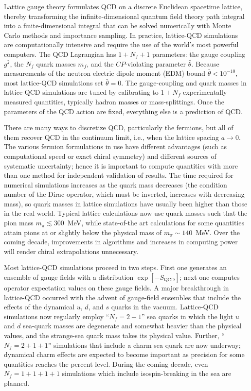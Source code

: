 Lattice gauge theory formulates QCD on a discrete Euclidean spacetime lattice,
thereby transforming the infinite-dimensional quantum field theory path
integral into a finite-dimensional integral that can be solved numerically
with Monte Carlo methods and importance sampling.  In practice, lattice-QCD
simulations are computationally intensive and require the use of the world's
most powerful computers.  The QCD Lagrangian has $1 + N_f + 1$ parameters: the
gauge coupling $g^2$, the $N_f$ quark masses $m_f$, and the $CP$-violating
parameter $\bar{\theta}$.  Because measurements of the neutron electric dipole
moment (EDM) bound $\bar{\theta} < 10^{-10}$, most lattice-QCD simulations set
$\bar{\theta} = 0$.  The gauge-coupling and quark masses in lattice-QCD
simulations are tuned by calibrating to $1 + N_f$ experimentally-measured
quantities, typically hadron masses or mass-splittings.  Once the parameters
of the QCD action are fixed, everything else is a prediction of QCD.

There are many ways to discretize QCD, particularly the fermions, but all of
them recover QCD in the continuum limit, i.e., when the lattice spacing $a\to
0$.  The various fermion formulations in use have different advantages (such
as computational speed or exact chiral symmetry) and different sources of
systematic uncertainty; hence it is important to compute quantities with more
than one method for independent validation of results.  The time required for
numerical simulations increases as the quark mass decreases (the condition
number of the Dirac operator, which must be inverted, increases with
decreasing mass), so quark masses in lattice simulations have usually been
higher than those in the real world.  Typical lattice calculations now use
quark masses such that the pion mass $m_\pi \lesssim 300$~MeV, while
state-of-the art calculations for some quantities attain pions at or slightly
below the physical mass of $m_\pi\sim140$~MeV.  Over the coming decade,
improvements in algorithms and increases in computing power will render chiral
extrapolations unnecessary.

Most lattice-QCD simulations proceed in two steps.  First one generates an
ensemble of gauge fields with a distribution $\exp[-S_\text{QCD}]$; next one
computes operator expectation values on these gauge fields.  A major
breakthrough in lattice-QCD occurred with the advent of gauge-field ensembles
that include the effects of the dynamical $u$, $d$, and $s$ quarks in the
vacuum.  Lattice-QCD simulations now regularly employ ``$N_f = 2+1$'' sea
quarks in which the light $u$ and $d$ sea-quark masses are degenerate and
somewhat heavier than the physical values, and the strange-sea quark mass
takes its physical value.  Further, ``$N_f = 2 + 1 + 1$'' simulations that
include a charm sea quark are now underway; dynamical charm effects are
expected to become important as precision for some quantities reaches the
percent level.  During the coming decade, even $N_f=1+1+1+1$ simulations which
include isospin-breaking in the sea are planned.

